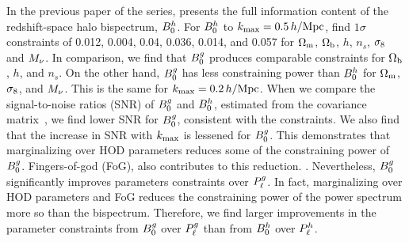 


In the previous paper of the series, \cite{hahn2020} presents the full
information content of the redshift-space halo bispectrum, $B^h_0$. For $B^h_0$ to
$k_{\rm max}=0.5\,h/\mathrm{Mpc}$, \cite{hahn2020} find $1\sigma$ constraints of 0.012, 0.004,
0.04, 0.036, 0.014, and 0.057 for $\Omega_{\rm m}$, $\Omega_{\rm b}$, $h$, $n_s$, $\sigma_8$ and $M_\nu$. 
In comparison, we find that $B^g_0$ produces comparable constraints for $\Omega_{\rm b}$, 
$h$, and $n_s$. On the other hand, $B^g_0$ has less constraining power than 
$B^h_0$ for $\Omega_{\rm m}$, $\sigma_8$, and $M_\nu$. This is the same for $k_{\rm max}=0.2\,h/\mathrm{Mpc}$. 
When we compare the signal-to-noise ratios (SNR) of $B^g_0$ and $B^h_0$, estimated 
from the covariance matrix~\citep[\eg][]{sefusatti2005,sefusatti2006,chan2017}, 
we find lower SNR for $B^g_0$, consistent with the constraints. We also find that 
the increase in SNR with $k_{\rm max}$ is lessened for $B^g_0$. This demonstrates that 
marginalizing over HOD parameters reduces some of the constraining power of 
$B^g_0$.  Fingers-of-god (FoG), also contributes to this reduction. 
.
Nevertheless, $B^g_0$ significantly improves parameters constraints over $P^g_{\ell}$.
In fact, marginalizing over HOD parameters and FoG reduces the constraining
power of the power spectrum more so than the bispectrum. Therefore, we find 
larger improvements in the parameter constraints from $B^g_0$ over $P^g_{\ell}$ than
from $B^h_0$ over $P^h_{\ell}$.

